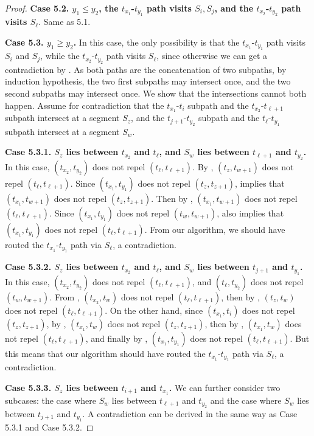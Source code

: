 \documentclass[11pt]{article}
\begin{document}
\begin{proof}
\textbf{Case 5.2. $y_1 \le y_2$, the $t_{x_1}$-$t_{y_1}$ path visits $S_i,S_j$, and the $t_{x_2}$-$t_{y_2}$ path visits $S_{\ell}$}.
Same as 5.1.

\textbf{Case 5.3. $y_1 \ge y_2$.} 
In this case, the only possibility is that the $t_{x_1}$-$t_{y_1}$ path visits $S_i$ and $S_j$, while the $t_{x_2}$-$t_{y_2}$ path visits $S_{\ell}$, since otherwise we can get a contradiction by . 
%
As both paths are the concatenation of two subpaths, by induction hypothesis, the two first subpaths may intersect once, and the two second subpaths may intersect once. We show that the intersections cannot both happen. 
Assume for contradiction that the $t_{x_1}$-$t_i$ subpath and the $t_{x_2}$-$t_{\ell+1}$ subpath intersect at a segment $S_z$, and the $t_{j+1}$-$t_{y_2}$ subpath and the $t_{\ell}$-$t_{y_1}$ subpath intersect at a segment $S_w$.

\textbf{Case 5.3.1. $S_z$ lies between $t_{x_2}$ and $t_{\ell}$, and $S_w$ lies between $t_{\ell+1}$ and $t_{y_2}$.} In this case, $(t_{x_2},t_{y_2})$ does not repel $(t_{\ell},t_{\ell+1})$. By , $(t_z,t_{w+1})$ does not repel $(t_{\ell},t_{\ell+1})$. Since $(t_{x_1},t_{y_1})$ does not repel $(t_z,t_{z+1})$,  implies that $(t_{x_1},t_{w+1})$ does not repel $(t_z,t_{z+1})$. Then by , $(t_{x_1},t_{w+1})$ does not repel $(t_{\ell},t_{\ell+1})$. Since $(t_{x_1},t_{y_1})$ does not repel $(t_w,t_{w+1})$,  also implies that $(t_{x_1},t_{y_1})$ does not repel $(t_{\ell},t_{\ell+1})$. From our algorithm, we should have routed the $t_{x_1}$-$t_{y_1}$ path via $S_{\ell}$, a contradiction.

\textbf{Case 5.3.2. $S_z$ lies between $t_{x_2}$ and $t_{\ell}$, and $S_w$ lies between $t_{j+1}$ and $t_{y_1}$.} In this case, $(t_{x_2},t_{y_2})$ does not repel $(t_{\ell},t_{\ell+1})$, and $(t_{\ell},t_{y_2})$ does not repel $(t_w,t_{w+1})$. From , $(t_{x_2},t_w)$ does not repel $(t_{\ell},t_{\ell+1})$, then by , $(t_z,t_w)$ does not repel $(t_{\ell},t_{\ell+1})$. On the other hand, since $(t_{x_1},t_i)$ does not repel $(t_z,t_{z+1})$, by , $(t_{x_1},t_w)$ does not repel $(t_z,t_{z+1})$, then by , $(t_{x_1},t_w)$ does not repel $(t_{\ell},t_{\ell+1})$, and finally by , $(t_{x_1},t_{y_1})$ does not repel $(t_{\ell},t_{\ell+1})$. But this means that our algorithm should have routed the $t_{x_1}$-$t_{y_1}$ path via $S_{\ell}$, a contradiction.

\textbf{Case 5.3.3. $S_z$ lies between $t_{i+1}$ and $t_{x_1}$.} We can further consider two subcases: the case where $S_w$ lies between $t_{\ell+1}$ and $t_{y_2}$ and the case where $S_w$ lies between $t_{j+1}$ and $t_{y_1}$. A contradiction can be derived in the same way as Case 5.3.1 and Case 5.3.2. 
\end{proof}
\end{document}

